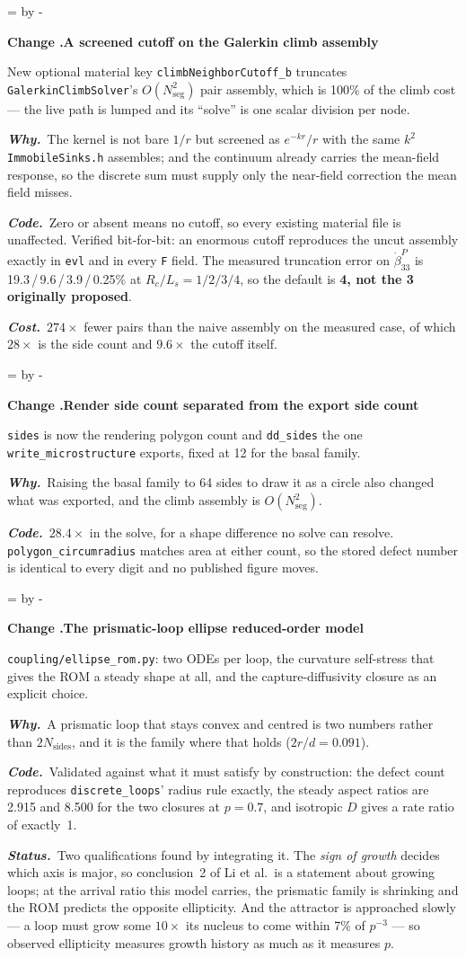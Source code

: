 \documentclass[11pt,a4paper]{article}
\newcommand{\code}[1]{\texttt{\small #1}}
\newcommand{\needlines}[1]{%
  \par\dimen0=\pagegoal \advance\dimen0 by -\pagetotal
  \ifdim\dimen0<#1\baselineskip \newpage \fi}
\newcounter{chg}
\newcommand{\change}[1]{%
  \needlines{4}%
  \refstepcounter{chg}%
  \par\medskip\noindent
  {\bfseries\boldmath Change \thechg.\quad #1}%
  \par\nobreak\smallskip}
\newcommand{\why}[1]{\par\noindent\textbf{\itshape Why.}\ #1\par}
\newcommand{\impact}[1]{\par\noindent\textbf{\itshape Code.}\ #1\par}
\newcommand{\cost}[1]{\par\noindent\textbf{\itshape Cost.}\ #1\par}
\newcommand{\status}[1]{\par\noindent\textbf{\itshape Status.}\ #1\par}
\begin{document}
\change{A screened cutoff on the Galerkin climb assembly}
\label{chg:climb-cutoff}
New optional material key \code{climbNeighborCutoff\_b} truncates
\code{GalerkinClimbSolver}'s $O(N_{\text{seg}}^2)$ pair assembly, which is
100\% of the climb cost --- the live path is lumped and its ``solve'' is one
scalar division per node.
\why{The kernel is not bare $1/r$ but screened as $e^{-kr}/r$ with the same
$k^2$ \code{ImmobileSinks.h} assembles; and the continuum already carries the
mean-field response, so the discrete sum must supply only the near-field
correction the mean field misses.}
\impact{Zero or absent means no cutoff, so every existing material file is
unaffected. Verified bit-for-bit: an enormous cutoff reproduces the uncut
assembly exactly in \code{evl} and in every \code{F} field. The measured
truncation error on $\dot\beta^P_{33}$ is 19.3\,/\,9.6\,/\,3.9\,/\,0.25\% at
$R_c/L_s=1/2/3/4$, so the default is \textbf{4, not the 3 originally
proposed}.}
\cost{$274\times$ fewer pairs than the naive assembly on the measured case, of
which $28\times$ is the side count and $9.6\times$ the cutoff itself.}

\change{Render side count separated from the export side count}
\label{chg:dd-sides}
\code{sides} is now the rendering polygon count and \code{dd\_sides} the one
\code{write\_microstructure} exports, fixed at 12 for the basal family.
\why{Raising the basal family to 64 sides to draw it as a circle also changed
what was exported, and the climb assembly is $O(N_{\text{seg}}^2)$.}
\impact{$28.4\times$ in the solve, for a shape difference no solve can resolve.
\code{polygon\_circumradius} matches area at either count, so the stored defect
number is identical to every digit and no published figure moves.}

\change{The prismatic-loop ellipse reduced-order model}
\label{chg:ellipse-rom}
\code{coupling/ellipse\_rom.py}: two ODEs per loop, the curvature self-stress
that gives the ROM a steady shape at all, and the capture-diffusivity closure
as an explicit choice.
\why{A prismatic loop that stays convex and centred is two numbers rather than
$2N_{\text{sides}}$, and it is the family where that holds ($2r/d=0.091$).}
\impact{Validated against what it must satisfy by construction: the defect
count reproduces \code{discrete\_loops}' radius rule exactly, the steady aspect
ratios are 2.915 and 8.500 for the two closures at $p=0.7$, and isotropic $D$
gives a rate ratio of exactly~1.}
\status{Two qualifications found by integrating it. The \emph{sign of growth}
decides which axis is major, so conclusion~2 of Li et al.\ is a statement about
growing loops; at the arrival ratio this model carries, the prismatic family is
shrinking and the ROM predicts the opposite ellipticity. And the attractor is
approached slowly --- a loop must grow some $10\times$ its nucleus to come
within 7\% of $p^{-3}$ --- so observed ellipticity measures growth history as
much as it measures $p$.}
\end{document}
